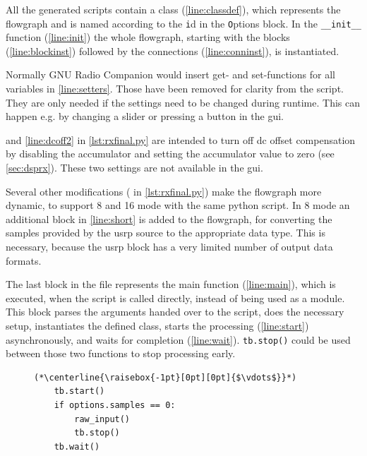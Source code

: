 \documentclass[12pt,a4paper,parskip=full,abstracton]{scrartcl}
\begin{document}
All the generated scripts contain a class (\cref{line:classdef}), which represents the flowgraph
and is named according to the {\texttt id} in the {\texttt Options} block. In the
\lstinline{__init__} function (\cref{line:init}) the whole flowgraph,
starting with the blocks (\cref{line:blockinst}) followed by the connections
(\cref{line:conninst}), is instantiated.

Normally GNU Radio Companion would insert get- and set-functions for all
variables in \cref{line:setters}. Those have been removed for clarity from the
script. They are only needed if the settings need to be changed during runtime.
This can happen e.g. by changing a slider or pressing a button in the
\gls{gui}.

 and \cref{line:dcoff2} in \cref{lst:rxfinal.py} are intended to turn off \gls{dc} offset
compensation by disabling the accumulator and setting the accumulator value to zero 
(see \cref{sec:dsprx}). These two settings are not available in the \gls{gui}.

Several other modifications ( in \cref{lst:rxfinal.py})
make the flowgraph more dynamic, to support \SI{8}{\bit} and \SI{16}{\bit} mode with
the same python script. In \SI{8}{\bit} mode an additional block in \cref{line:short}
is added to the flowgraph, for converting the samples provided by the \gls{usrp} source
to the appropriate data type. This is necessary, because the \gls{usrp} block has a
very limited number of output data formats.

The last block in the file represents the main function (\cref{line:main}),
which is executed, when the script is called directly, instead of being
used as a module. This block parses the arguments handed over to the script,
does the necessary setup, instantiates the defined class, starts the processing
(\cref{line:start}) asynchronously, and waits for completion (\cref{line:wait}).
\lstinline{tb.stop()} could be used between those two functions to
stop processing early.

\begin{figure}[htbp]
    \centering
    \begin{lstlisting}[basicstyle=\tiny,caption={Excerpt from ({\ttfamily tx\_final.py)} demonstrating stop.},label=lst:txfinal.py]
    (*\centerline{\raisebox{-1pt}[0pt][0pt]{$\vdots$}}*)
    tb.start()
    if options.samples == 0:
        raw_input() 
        tb.stop()
    tb.wait()
    \end{lstlisting}
\end{figure}
\end{document}
